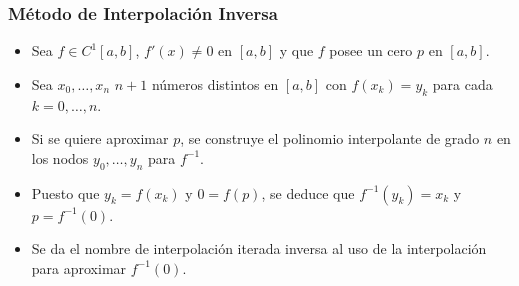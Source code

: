 \documentclass{beamer}
\begin{document}
\begin{frame}
  \frametitle{M\'etodo de Interpolaci\'on Inversa}
  \begin{itemize}
    \item Sea $f \in C^1[a,b]$, $f'(x) \neq 0$ en $[a,b]$ y que $f$ posee un cero $p$ en $[a,b]$.
    \item<2-> Sea $x_0,\ldots,x_n$ $n+1$ n\'umeros distintos en $[a,b]$ con $f(x_k)=y_k$ para cada $k=0,\ldots,n$.
    \item<3-> Si se quiere aproximar $p$, se construye el 
    polinomio interpolante de grado $n$ en los nodos $y_0,\ldots,y_n$ para $f^{-1}$.
    \item<4-> Puesto que $y_k=f(x_k)$ y $0=f(p)$, se 
    deduce que $f^{-1}(y_k)=x_k$ y $p=f^{-1}(0)$.
    \item<5-> Se da el nombre de interpolaci\'on iterada inversa al uso de la
    interpolaci\'on para aproximar $f^{-1}(0)$.
  \end{itemize}  
\end{frame}
\end{document}
